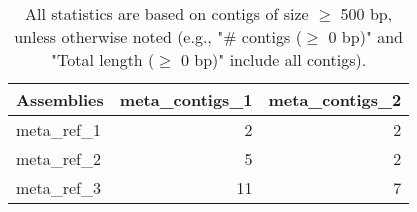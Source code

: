 \documentclass[12pt,a4paper]{article}
\begin{document}
\begin{table}[ht]
\begin{center}
\caption{All statistics are based on contigs of size $\geq$ 500 bp, unless otherwise noted (e.g., "\# contigs ($\geq$ 0 bp)" and "Total length ($\geq$ 0 bp)" include all contigs).}
\begin{tabular}{|l*{2}{|r}|}
\hline
Assemblies & meta\_contigs\_1 & meta\_contigs\_2 \\ \hline
meta\_ref\_1 & 2 & 2 \\ \hline
meta\_ref\_2 & 5 & 2 \\ \hline
meta\_ref\_3 & 11 & 7 \\ \hline
\end{tabular}
\end{center}
\end{table}
\end{document}
